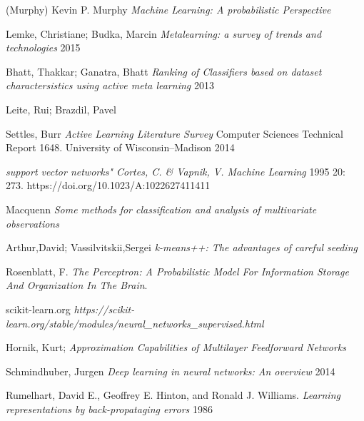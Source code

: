 \documentclass[
11pt, %
english, %
singlespacing, %
headsepline, %
]{MastersDoctoralThesis} %
\begin{document}
\begin{thebibliography}
\bibitem(Murphy)
Kevin P. Murphy
\textit{Machine Learning: A probabilistic Perspective}

 Lemke, Christiane; Budka, Marcin
 \textit{Metalearning: a survey of trends and technologies} 2015

 Bhatt, Thakkar; Ganatra, Bhatt
 \textit{Ranking of Classifiers based on dataset charactersistics using active meta learning} 2013

 Leite, Rui; Brazdil, Pavel

Settles, Burr
\textit{Active Learning Literature Survey}
 Computer Sciences Technical Report 1648. University of Wisconsin–Madison 2014

\textit{support vector networks" Cortes, C. & Vapnik, V. Machine Learning } 1995
20: 273. https://doi.org/10.1023/A:1022627411411

Macquenn
\textit{Some methods for classification and analysis of multivariate observations}

Arthur,David; Vassilvitskii,Sergei
 \textit{k-means++: The advantages of careful seeding}

Rosenblatt, F.
\textit{The Perceptron: A Probabilistic Model For Information Storage And Organization In The Brain}.%

scikit-learn.org
\textit{https://scikit-learn.org/stable/modules/neural_networks_supervised.html}

Hornik, Kurt;
\textit{Approximation Capabilities of Multilayer Feedforward Networks}

Schmindhuber, Jurgen
\textit{Deep learning in neural networks: An overview} 2014

Rumelhart, David E., Geoffrey E. Hinton, and Ronald J. Williams.
\textit{Learning representations by back-propataging errors} 1986

\end{thebibliography}

\end{document}

